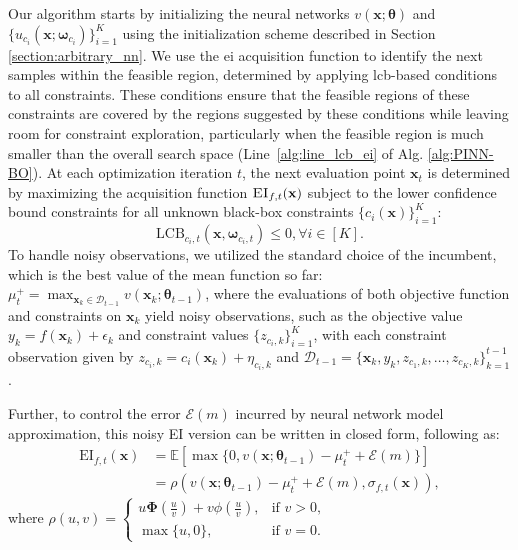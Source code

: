 Our algorithm starts by initializing the neural networks $v(\mathbf{x}; \boldsymbol{\theta})$ and $\{u_{c_i}(\mathbf{x}; \boldsymbol{\omega}_{c_i})\}_{i=1}^K$ using the initialization scheme described in Section \ref{section:arbitrary_nn}. We use the \ac{ei} acquisition function to identify the next samples within the feasible region, determined by applying \ac{lcb}-based conditions to all constraints. These conditions ensure that the feasible regions of these constraints are covered by the regions suggested by these conditions while leaving room for constraint exploration, particularly when the feasible region is much smaller than the overall search space  (Line~\ref{alg:line_lcb_ei} of Alg. \ref{alg:PINN-BO}). At each optimization iteration $t$, the next evaluation point $\mathbf{x}_t$ is determined by maximizing the acquisition function $\textsc{EI}_{f,t}(\mathbf{x})$ subject to the lower confidence bound constraints for all unknown black-box constraints $\{c_i(\mathbf{x})\}_{i=1}^K$:
\[
\text{LCB}_{c_i,t}(\mathbf{x}, \boldsymbol{\omega}_{c_i,t}) \le 0, \forall i \in [K].
\]
To handle noisy observations, we utilized the standard choice of the incumbent, which is
the best value of the mean function so far:
$\mu^+_t = \max_{\mathbf{x}_k \in \mathcal{D}_{t-1}} v(\mathbf{x}_k; \boldsymbol{\theta}_{t-1})$, where  
the evaluations of both objective function and constraints on $\mathbf{x}_k$ yield noisy observations, such as the objective value $y_k = f(\mathbf{x}_k) + \epsilon_k$ and constraint values $\{z_{c_i,k}\}_{i=1}^K$, with each constraint observation given by $z_{c_i,k} = c_i(\mathbf{x}_k) + \eta_{c_i,k}$ and $\mathcal{D}_{t-1} = \{\mathbf{x}_k, y_k, z_{c_1,k}, \dots, z_{{c_K}, k}\}_{k=1}^{t-1}$. 


Further, to control the error $\mathcal{E}(m)$ incurred by neural network model approximation, this noisy EI version can be written in closed form, following \citet{tran2022regret} as: 
\begin{align*}
    \text{EI}_{f,t}(\mathbf{x}) &= \mathbb{E}[\max \{0, v(\mathbf{x}; \boldsymbol{\theta}_{t-1}) - \mu^+_t + \mathcal{E}(m)\}]
    \\
    &= \rho (v(\mathbf{x}; \boldsymbol{\theta}_{t-1})- \mu^+_t + \mathcal{E}(m), \sigma_{f,t}(\mathbf{x})), 
\end{align*}
where $
  \rho(u,v) =
    \begin{cases}
      u \boldsymbol{\Phi}(\frac{u}{v}) + v \phi(\frac{u}{v}), & \text{if } v>0,
      \\
      \max \{u, 0\}, & \text{if } v=0.
    \end{cases}       
$
 

